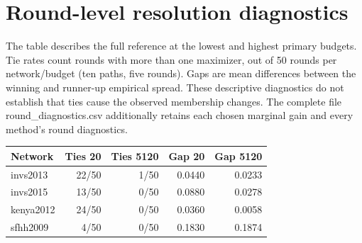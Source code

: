 \documentclass[11pt]{article}
\begin{document}
\section{Round-level resolution diagnostics}
The table describes the full reference at the lowest and highest primary budgets. Tie rates count rounds with more than one maximizer, out of 50 rounds per network/budget (ten paths, five rounds). Gaps are mean differences between the winning and runner-up empirical spread. These descriptive diagnostics do not establish that ties cause the observed membership changes. The complete file round\_diagnostics.csv additionally retains each chosen marginal gain and every method's round diagnostics.
\begin{center}\begin{tabular}{lrrrr}\toprule Network & Ties 20 & Ties 5120 & Gap 20 & Gap 5120 \\ \midrule
invs2013 & 22/50 & 1/50 & 0.0440 & 0.0233 \\
invs2015 & 13/50 & 0/50 & 0.0880 & 0.0278 \\
kenya2012 & 24/50 & 0/50 & 0.0360 & 0.0058 \\
sfhh2009 & 4/50 & 0/50 & 0.1830 & 0.1874 \\
\bottomrule\end{tabular}\end{center}
\end{document}
